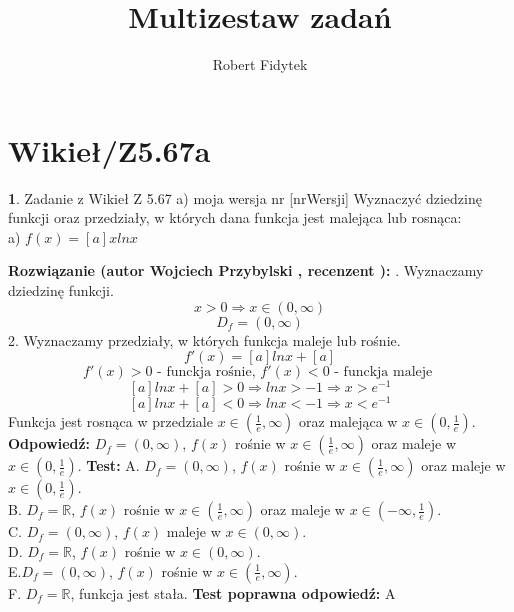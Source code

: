 \documentclass[12pt, a4paper]{article}
\title{Multizestaw zadań}
\author{Robert Fidytek}
\date{}
\theoremstyle{definition} %
\newtheorem{zad}{}
\newcommand{\kategoria}[1]{\section{#1}} %
\newcommand{\zadStart}[1]{\begin{zad}#1\newline} %
\newcommand{\zadStop}{\end{zad}}   %
\newcommand{\rozwStart}[2]{\noindent \textbf{Rozwiązanie (autor #1 , recenzent #2): }\newline} %
\newcommand{\rozwStop}{\newline}                                            %
\newcommand{\odpStart}{\noindent \textbf{Odpowiedź:}\newline}    %
\newcommand{\odpStop}{\newline}                                             %
\newcommand{\testStart}{\noindent \textbf{Test:}\newline} %
\newcommand{\testStop}{\newline} %
\newcommand{\kluczStart}{\noindent \textbf{Test poprawna odpowiedź:}\newline} %
\newcommand{\kluczStop}{\newline} %
\begin{document}
\maketitle


\kategoria{Wikieł/Z5.67a}
\zadStart{Zadanie z Wikieł Z 5.67 a) moja wersja nr [nrWersji]}
Wyznaczyć dziedzinę funkcji oraz przedziały, w których dana funkcja jest malejąca lub rosnąca:\\
a) $f(x)=[a]xlnx$
\zadStop
\rozwStart{Wojciech Przybylski}{}
1. Wyznaczamy dziedzinę funkcji.
$$x>0 \Rightarrow x\in(0,\infty)$$
$$D_{f}=(0,\infty)$$
2. Wyznaczamy przedziały, w których funkcja maleje lub rośnie. 
$$f'(x)=[a]lnx+[a]$$
$$f'(x)>0 \mbox{ - funckja rośnie, } f'(x)<0 \mbox{ - funckja maleje }$$
$$[a]lnx+[a]>0 \Rightarrow lnx>-1 \Rightarrow x>e^{-1}$$
$$[a]lnx+[a]<0 \Rightarrow lnx<-1 \Rightarrow x<e^{-1}$$
Funkcja jest rosnąca w przedziale $x\in(\frac{1}{e},\infty)$ oraz malejąca w $x\in(0,\frac{1}{e})$.
\rozwStop
\odpStart
$D_{f}=(0,\infty)$, $f(x)$ rośnie w $x\in(\frac{1}{e},\infty)$ oraz maleje w $x\in(0,\frac{1}{e})$.
\odpStop
\testStart
A. $D_{f}=(0,\infty)$, $f(x)$ rośnie w $x\in(\frac{1}{e},\infty)$ oraz maleje w $x\in(0,\frac{1}{e})$.\\
B. $D_{f}=\mathbb{R}$, $f(x)$ rośnie w $x\in(\frac{1}{e},\infty)$ oraz maleje w $x\in(-\infty,\frac{1}{e})$.\\
C. $D_{f}=(0,\infty)$, $f(x)$ maleje w $x\in(0,\infty)$.\\
D. $D_{f}=\mathbb{R}$, $f(x)$ rośnie w $x\in(0,\infty)$.\\
E.$D_{f}=(0,\infty)$, $f(x)$ rośnie w $x\in(\frac{1}{e},\infty)$.\\
F. $D_{f}=\mathbb{R}$, funkcja jest stała.
\testStop
\kluczStart
A
\kluczStop
\end{document}
